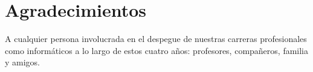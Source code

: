 
\chapter*{Agradecimientos}

A cualquier persona involucrada en el despegue de nuestras carreras profesionales como informáticos a lo largo de estos cuatro años: profesores, compañeros, familia y amigos.










